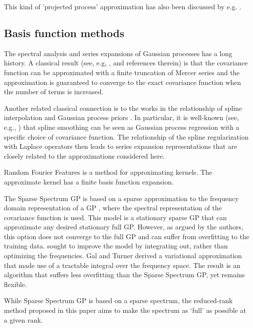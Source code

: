 \documentclass[]{interact}
\theoremstyle{plain}%
\theoremstyle{definition}
\theoremstyle{remark}
\begin{document}
This kind of 'projected process' approximation has also been discussed by e.g. \cite{banerjee2008gaussian}.


\subsection{Basis function methods}

The spectral analysis and series expansions of Gaussian processes has a long history. A classical result (see, e.g, \cite{loeve1977probability,trees1968detection,adler1981geometry,cramer2013stationary}, and references therein) is that the covariance function can be approximated with a finite truncation of Mercer series and the approximation is guaranteed to converge to the exact covariance function when the number of terms is increased. 

Another related classical connection is to the works in the relationship of spline interpolation and Gaussian process priors \citep{wahba1978improper,kimeldorf1970correspondence,wahba1990spline}. In particular, it is well-known (see, e.g., \cite{wahba1990spline}) that spline smoothing can be seen as Gaussian process regression with a specific choice of covariance function. The relationship of the spline regularization with Laplace operators then leads to series expansion representations that are closely related to the approximations considered here. 

Random Fourier Features \citep{rahimi2008random,rahimi2009weighted} is a method for approximating kernels. The approximate kernel has a finite basis function expansion.


The Sparse Spectrum GP is based on a sparse approximation to the frequency domain representation of a GP \citep{lazaro2010sparse,quia2010sparse}, where the spectral representation of the covariance function is used. This model is a stationary sparse GP that can approximate any desired stationary full GP. However, as argued by the authors, this option does not converge to the full GP and can suffer from overfitting to the training data. \citep{gal2015improving} sought to improve the model by integrating out, rather than optimizing the frequencies. Gal and Turner derived a variational approximation that made use of a tractable integral over the frequency space. The result is an  algorithm that suffers less overfitting than the Sparse Spectrum GP, yet remains flexible.

While Sparse Spectrum GP is based on a sparse spectrum, the reduced-rank method proposed in this paper aims to make the spectrum as ‘full’ as possible at a given rank.
\end{document}
